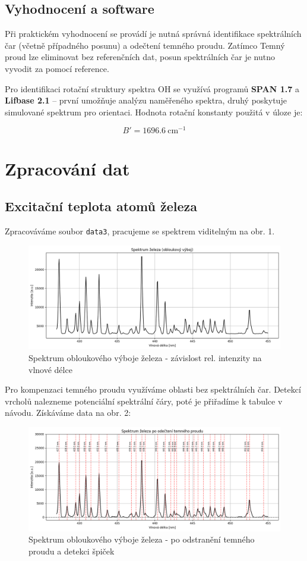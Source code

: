 \documentclass[czech,11pt,a4paper]{article}
\begin{document}
\begin{multicols}{2}
		
		\subsection{Vyhodnocení a software}
		
		Při praktickém vyhodnocení se provádí je nutná správná identifikace spektrálních čar (včetně případného posunu) a odečtení temného proudu. Zatímco Temný proud lze eliminovat bez referenčních dat, posun spektrálních čar je nutno vyvodit za pomocí reference.

		
		Pro identifikaci rotační struktury spektra OH se využívá programů \textbf{SPAN 1.7} a \textbf{Lifbase 2.1} – první umožňuje analýzu naměřeného spektra, druhý poskytuje simulované spektrum pro orientaci. Hodnota rotační konstanty použitá v úloze je:
		
		\[
		B' = 1696.6\ \text{cm}^{-1}
		\]
		
		
		\section{Zpracování dat}
		\subsection{Excitační teplota atomů železa}
		Zpracováváme soubor \verb*|data3|, pracujeme se spektrem viditelným na obr. 1.
		\begin{figure}[H]
			\centering
			\includegraphics[width=0.9\linewidth]{spectrum}
			\caption{Spektrum obloukového výboje železa - závislost rel. intenzity na vlnové délce}

		\end{figure}
		Pro kompenzaci temného proudu využíváme oblasti bez spektrálních čar. Detekcí vrcholů nalezneme potenciální spektrální čáry, poté je přiřadíme k tabulce v návodu\cite{navod}. Získáváme data na obr. 2:
		
		\begin{figure}[H]
			\centering
			\includegraphics[width=0.9\linewidth]{spectrum2}
			\caption{Spektrum obloukového výboje železa - po odstranění temného proudu a detekci špiček}


\end{figure}
\end{multicols}
\end{document}
